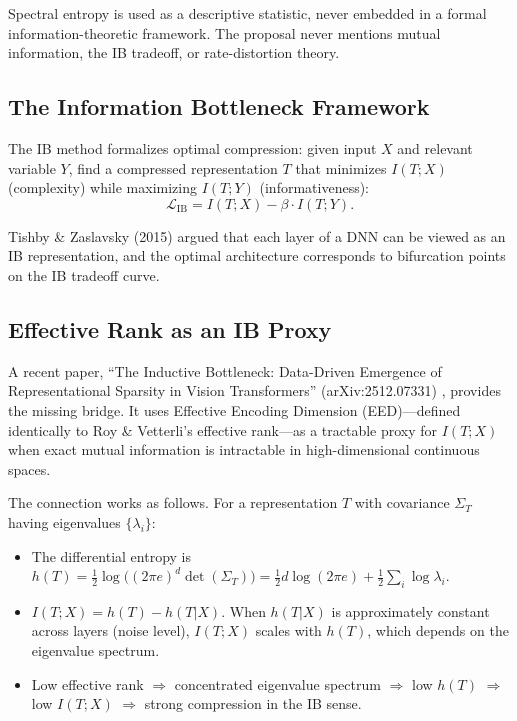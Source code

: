 \documentclass[11pt,a4paper]{article}
\begin{document}
\begin{criticalbox}
Spectral entropy is used as a descriptive statistic, never embedded in a formal information-theoretic framework. The proposal never mentions mutual information, the IB tradeoff, or rate-distortion theory.
\end{criticalbox}

\subsection{The Information Bottleneck Framework}

The IB method \cite{tishby1999information} formalizes optimal compression: given input $X$ and relevant variable $Y$, find a compressed representation $T$ that minimizes $I(T; X)$ (complexity) while maximizing $I(T; Y)$ (informativeness):
\begin{equation}
    \mathcal{L}_{\text{IB}} = I(T; X) - \beta \cdot I(T; Y).
\end{equation}

Tishby \& Zaslavsky (2015) \cite{tishby2015deep} argued that each layer of a DNN can be viewed as an IB representation, and the optimal architecture corresponds to bifurcation points on the IB tradeoff curve.

\subsection{Effective Rank as an IB Proxy}

\begin{insightbox}
A recent paper, ``The Inductive Bottleneck: Data-Driven Emergence of Representational Sparsity in Vision Transformers'' (arXiv:2512.07331) \cite{inductivebottleneck2025}, provides the missing bridge. It uses Effective Encoding Dimension (EED)---defined identically to Roy \& Vetterli's effective rank---as a tractable proxy for $I(T;X)$ when exact mutual information is intractable in high-dimensional continuous spaces.
\end{insightbox}

The connection works as follows. For a representation $T$ with covariance $\Sigma_T$ having eigenvalues $\{\lambda_i\}$:
\begin{itemize}
    \item The differential entropy is $h(T) = \frac{1}{2}\log\bigl((2\pi e)^d \det(\Sigma_T)\bigr) = \frac{1}{2}d\log(2\pi e) + \frac{1}{2}\sum_i \log \lambda_i$.
    \item $I(T; X) = h(T) - h(T|X)$. When $h(T|X)$ is approximately constant across layers (noise level), $I(T;X)$ scales with $h(T)$, which depends on the eigenvalue spectrum.
    \item Low effective rank $\Rightarrow$ concentrated eigenvalue spectrum $\Rightarrow$ low $h(T)$ $\Rightarrow$ low $I(T;X)$ $\Rightarrow$ strong compression in the IB sense.
\end{itemize}
\end{document}
